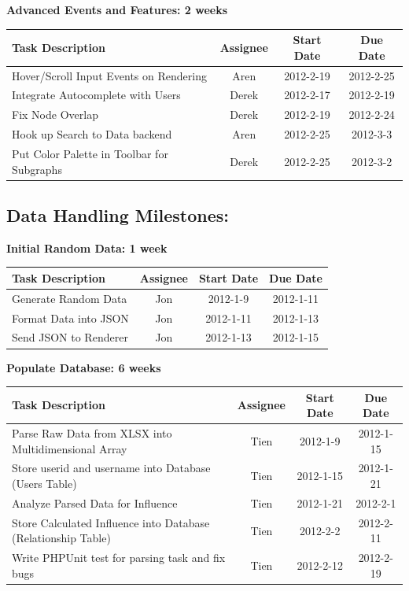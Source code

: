 \documentclass[12pt, letterpaper]{article}
\begin{document}
  \begin{center}
		{\bf Advanced Events and Features: 2 weeks}
    \begin{tabular}{| p{8.3cm} || c | c | c | }
      \hline
      Task Description & Assignee & Start Date & Due Date \\
      \hline
	    Hover/Scroll Input Events on Rendering & Aren & 2012-2-19 & 2012-2-25 \\
        Integrate Autocomplete with Users & Derek & 2012-2-17 & 2012-2-19 \\
	    Fix Node Overlap & Derek & 2012-2-19 & 2012-2-24 \\
	    Hook up Search to Data backend & Aren & 2012-2-25 & 2012-3-3 \\
	    Put Color Palette in Toolbar for Subgraphs & Derek & 2012-2-25 & 2012-3-2 \\
      \hline
    \end{tabular}
  \end{center}

  	\subsection{Data Handling Milestones:}

  \begin{center}
		{\bf Initial Random Data: 1 week}
    \begin{tabular}{| p{8.3cm} || c | c | c | }
      \hline
      Task Description & Assignee & Start Date & Due Date \\
      \hline
	    Generate Random Data & Jon & 2012-1-9 & 2012-1-11 \\
	    Format Data into JSON & Jon & 2012-1-11 & 2012-1-13 \\
	    Send JSON to Renderer & Jon & 2012-1-13 & 2012-1-15 \\
      \hline
    \end{tabular}
  \end{center}

  \begin{center}
		{\bf Populate Database: 6 weeks}
    \begin{tabular}{| p{8.3cm} || c | c | c | }
      \hline
      Task Description & Assignee & Start Date & Due Date \\
      \hline
	    Parse Raw Data from XLSX into Multidimensional Array & Tien & 2012-1-9 & 2012-1-15 \\
        Store userid and username into Database (Users Table) & Tien & 2012-1-15 & 2012-1-21 \\
	    Analyze Parsed Data for Influence & Tien & 2012-1-21 & 2012-2-1 \\
        Store Calculated Influence into Database (Relationship Table) & Tien & 2012-2-2 & 2012-2-11 \\
		Write PHPUnit test for parsing task and fix bugs & Tien & 2012-2-12 & 2012-2-19 \\
      \hline
    \end{tabular}
  \end{center}
\end{document}
